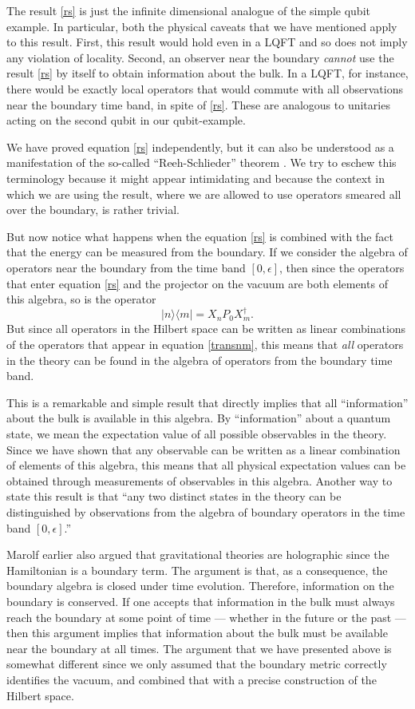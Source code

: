 \documentclass[12pt]{article}
\newcommand{\be}{\begin{equation}}
\newcommand{\ee}{\end{equation}}
\def\projvac{{\cal P}_{\Omega}}
\def\projvac{P_0}
\begin{document}
The result \eqref{rs} is just the infinite dimensional analogue of the simple qubit example. In particular, both the physical caveats that we have mentioned apply to this result. First, this result would hold even in a LQFT and so does not imply any violation of locality. Second, an observer near the boundary {\em cannot} use the result \eqref{rs} by itself to obtain information about the bulk. In a LQFT, for instance, there would be exactly local operators that would commute with all observations near the boundary time band, in spite of \eqref{rs}.  These are analogous to unitaries acting on the second qubit in our qubit-example.
 
We have proved equation \eqref{rs} independently, but it can also be understood as a manifestation of the so-called ``Reeh-Schlieder'' theorem \cite{Haag:1992hx}. We try to eschew this terminology because it might appear intimidating and  because the context in which we are using the result, where we are allowed to use operators smeared all over the boundary, is rather trivial. 


But now notice what happens when the equation \eqref{rs} is combined with the fact that the energy can be measured from the boundary. If we consider the algebra of operators near the boundary from the time band $[0, \epsilon]$, then since the operators that enter equation \eqref{rs} and the projector on the vacuum are both elements of this algebra, so is the operator
\be
\label{transnm}
|n \rangle \langle m| = X_n \projvac X_m^{\dagger}.
\ee
But since all operators in the Hilbert space can be written as linear combinations of the operators that appear in equation \eqref{transnm}, this means that {\em all} operators in the theory can be found in the algebra of operators from the boundary time band.

This is a remarkable and simple result 
that  directly implies that all ``information'' about the bulk is available in this algebra. By ``information'' about a quantum state, we mean the expectation value of all possible observables in the theory. Since we have shown that  any observable can be written as a linear combination of elements of this algebra, this means that all physical expectation values can be 
obtained through measurements of observables in this algebra. Another way to state this result is that ``any two distinct states in the theory can be distinguished by observations from the algebra of boundary operators in the time band $[0, \epsilon]$.''

Marolf earlier also argued \cite{Marolf:2008mf,Marolf:2006bk,Marolf:2013iba} that gravitational theories are holographic since the Hamiltonian is a boundary term. The  argument is that, as a consequence, the boundary algebra is closed under time evolution.  Therefore, information on the boundary is conserved. If one accepts that information in the bulk must always reach the boundary at some point of time --- whether in the future or the past --- then this argument implies that information about the bulk must be available near the boundary at all times. The argument that we have presented above is somewhat different since we only assumed that the boundary metric correctly identifies the vacuum, and combined that with a precise construction of the Hilbert space. 
\end{document}
